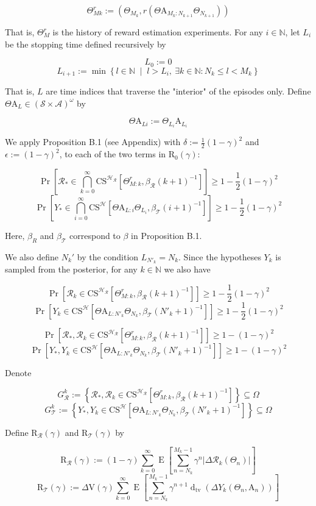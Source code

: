 \documentclass[a4paper]{article}
\newcommand{\AP}[1]{\left(#1\right)}
\newcommand{\AB}[1]{\left[#1\right]}
\newcommand{\AC}[1]{\left\{#1\right\}}
\newcommand{\ACM}[2]{\left\{#1\;\middle\vert\;#2\right\}}
\newcommand{\Abs}[1]{\left\vert #1 \right\vert}
\newcommand{\Pb}[1]{\operatorname{Pr}\AB{#1}}
\newcommand{\E}[1]{\operatorname{E}\AB{#1}}
\newcommand{\Dtva}[1]{\operatorname{d}_{\text{tv}}\AP{#1}}
\newcommand{\Nats}{\mathbb{N}}
\newcommand{\St}{\mathcal{S}}
\newcommand{\A}{\mathcal{A}}
\newcommand{\R}{\mathcal{R}}
\newcommand{\T}{\mathcal{T}}
\newcommand{\Hy}{\mathcal{H}}
\newcommand{\V}{\mathrm{V}}
\newcommand{\Reg}{\mathrm{R}}
\newcommand{\THy}{Y_*}
\newcommand{\SHy}{Y}
\newcommand{\AT}{\mathrm{A}}
\newcommand{\ET}{N}
\newcommand{\IT}{M}
\newcommand{\CSE}{G}
\newcommand{\CS}{\mathrm{CS}}
\begin{document}
$$\Theta_{Mk}^r:=\AP{\Theta_{M_k},r\AP{\Theta\AT_{M_k:N_{k+1}}\Theta_{N_{k+1}}}}$$

That is, $\Theta_M^r$ is the history of reward estimation experiments. For any $i\in\Nats$, let $L_i$ be the stopping time defined recursively by

$$L_0:=0$$
$$L_{i+1}:=\min\ACM{l\in\Nats}{l>L_i,\ \exists k\in\Nats:\ET_k\leq l < \IT_k}$$

That is, $L$ are time indices that traverse the "interior" of the episodes only. Define $\Theta\AT_L\in\AP{\St\times\A}^\omega$ by

$$\Theta\AT_{Li}:=\Theta_{L_i}\AT_{L_i}$$

We apply Proposition B.1 (see Appendix) with $\delta:=\frac{1}{2}(1-\gamma)^2$ and $\epsilon:=(1-\gamma)^2$, to each of the two terms in $\Reg_0(\gamma)$:

$$\Pb{\R_*\in\bigcap_{k=0}^\infty\CS^{\Hy_\R}\AB{\Theta_{M:k}^{r},\beta_\R(k+1)^{-1}}} \geq 1-\frac{1}{2}(1-\gamma)^2$$
$$\Pb{\SHy_*\in\bigcap_{i=0}^\infty\CS^{\Hy}\AB{\Theta\AT_{L:i}\Theta_{L_i},\beta_\T(i+1)^{-1}}} \geq 1-\frac{1}{2}(1-\gamma)^2$$

Here, $\beta_R$ and $\beta_\T$ correspond to $\beta$ in Proposition B.1.

We also define $N_k'$ by the condition $L_{N'_k}=N_k$. Since the hypotheses $\SHy_k$ is sampled from the posterior, for any $k\in\Nats$ we also have

$$\Pb{\R_k\in\CS^{\Hy_\R}\AB{\Theta_{M:k}^{r},\beta_\R(k+1)^{-1}}} \geq 1-\frac{1}{2}(1-\gamma)^2$$
$$\Pb{\SHy_{k}\in\CS^\Hy\AB{\Theta\AT_{L:N'_k}\Theta_{N_k},\beta_\T\AP{N'_k+1}^{-1}}} \geq 1-\frac{1}{2}(1-\gamma)^2$$

$$\Pb{\R_*,\R_k\in\CS^{\Hy_\R}\AB{\Theta_{M:k}^{r},\beta_\R(k+1)^{-1}}} \geq 1-(1-\gamma)^2$$
$$\Pb{\THy,\SHy_{k}\in\CS^\Hy\AB{\Theta\AT_{L:N'_k}\Theta_{N_k},\beta_\T\AP{N'_k+1}^{-1}}} \geq 1-(1-\gamma)^2$$

Denote

$$\CSE_\R^k:=\AC{\R_*,\R_k\in\CS^{\Hy_\R}\AB{\Theta_{M:k}^{r},\beta_\R(k+1)^{-1}}}\subseteq\Omega$$
$$\CSE_\T^k:=\AC{\THy,\SHy_{k}\in\CS^\Hy\AB{\Theta\AT_{L:N'_k}\Theta_{N_k},\beta_\T\AP{N'_k+1}^{-1}}}\subseteq\Omega$$

Define $\Reg_{\R}(\gamma)$ and $\Reg_{\T}(\gamma)$ by

$$\Reg_{\R}(\gamma):=(1-\gamma)\sum_{k=0}^\infty\E{\sum_{n=\ET_k}^{\IT_k-1}\gamma^{n}\Abs{\Delta\R_k\AP{\Theta_n}}}$$
$$\Reg_{\T}(\gamma):=\Delta\V(\gamma)\sum_{k=0}^\infty\E{\sum_{n=\ET_k}^{\IT_k-1}\gamma^{n+1}\Dtva{\Delta\SHy_k\AP{\Theta_n,\AT_n}}}$$
\end{document}
